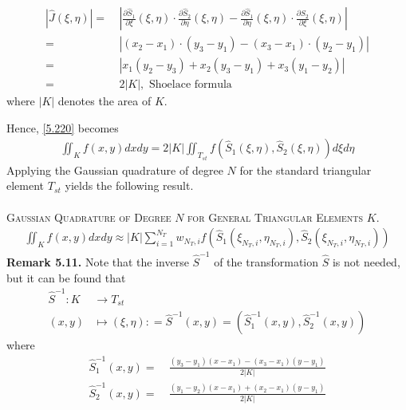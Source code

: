 \documentclass[a4paper]{article}
\numberwithin{equation}{section}
\begin{document}
\begin{align}
\left| {\widehat J\left( {\xi ,\eta } \right)} \right| =&\ \left| {\frac{{\partial {{\widehat S}_1}}}{{\partial \xi }}\left( {\xi ,\eta } \right) \cdot \frac{{\partial {{\widehat S}_2}}}{{\partial \eta }}\left( {\xi ,\eta } \right) - \frac{{\partial {{\widehat S}_1}}}{{\partial \eta }}\left( {\xi ,\eta } \right) \cdot \frac{{\partial {{\widehat S}_2}}}{{\partial \xi }}\left( {\xi ,\eta } \right)} \right|\\
 =&\ \left| {\left( {{x_2} - {x_1}} \right) \cdot \left( {{y_3} - {y_1}} \right) - \left( {{x_3} - {x_1}} \right) \cdot \left( {{y_2} - {y_1}} \right)} \right|\\
 =&\ \left| {{x_1}\left( {{y_2} - {y_3}} \right) + {x_2}\left( {{y_3} - {y_1}} \right) + {x_3}\left( {{y_1} - {y_2}} \right)} \right|\\
 =&\ 2\left| K \right|,\mbox{ Shoelace formula}
\end{align}
where $\left| K \right|$ denotes the area of $K$.

Hence, \eqref{5.220} becomes
\begin{align}
\iint_K {f\left( {x,y} \right)dxdy} = 2\left| K \right|\iint_{{T_{st}}} {f\left( {{{\widehat S}_1}\left( {\xi ,\eta } \right),{{\widehat S}_2}\left( {\xi ,\eta } \right)} \right)d\xi d\eta }
\end{align}
Applying the Gaussian quadrature of degree $N$ for the standard triangular element $T_{st}$ yields the following result.\\
\\
\textsc{Gaussian Quadrature of Degree $N$ for General Triangular Elements $K$.}
\begin{align}
\iint_K {f\left( {x,y} \right)dxdy} \approx \left| K \right|\sum\limits_{i = 1}^{{N_T}} {{w_{{N_T},i}}f\left( {{{\widehat S}_1}\left( {{\xi _{{N_T},i}},{\eta _{{N_T},i}}} \right),{{\widehat S}_2}\left( {{\xi _{{N_T},i}},{\eta _{{N_T},i}}} \right)} \right)} 
\end{align}
\textbf{Remark 5.11.} Note that the inverse ${\widehat S^{ - 1}}$ of the transformation $\widehat{S}$ is not needed, but it can be found that
\begin{align}
{\widehat S^{ - 1}}:K &\to {T_{st}}\\
\left( {x,y} \right) &\mapsto \left( {\xi ,\eta } \right): = {\widehat S^{ - 1}}\left( {x,y} \right) = \left( {\widehat S_1^{ - 1}\left( {x,y} \right),\widehat S_2^{ - 1}\left( {x,y} \right)} \right)
\end{align}
where 
\begin{align}
\widehat S_1^{ - 1}\left( {x,y} \right) =&\ \frac{{\left( {{y_3} - {y_1}} \right)\left( {x - {x_1}} \right) - \left( {{x_3} - {x_1}} \right)\left( {y - {y_1}} \right)}}{{2\left| K \right|}}\\
\widehat S_2^{ - 1}\left( {x,y} \right) =&\ \frac{{\left( {{y_1} - {y_2}} \right)\left( {x - {x_1}} \right) + \left( {{x_2} - {x_1}} \right)\left( {y - {y_1}} \right)}}{{2\left| K \right|}}
\end{align}
\end{document}
